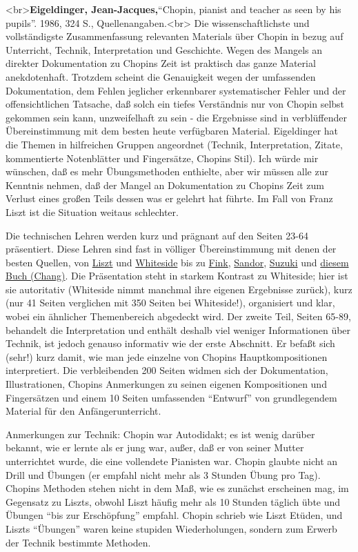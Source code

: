 \hypertarget{Eigeldinger}{}

<br>\textbf{Eigeldinger, Jean-Jacques,}\enquote{Chopin, pianist and teacher as seen by his pupils}. 1986, 324 S., Quellenangaben.<br>
Die wissenschaftlichste und vollständigste Zusammenfassung relevanten Materials über Chopin in bezug auf Unterricht, Technik, Interpretation und Geschichte.
Wegen des Mangels an direkter Dokumentation zu Chopins Zeit ist praktisch das ganze Material anekdotenhaft.
Trotzdem scheint die Genauigkeit wegen der umfassenden Dokumentation, dem Fehlen jeglicher erkennbarer systematischer Fehler und der offensichtlichen Tatsache, daß solch ein tiefes Verständnis nur von Chopin selbst gekommen sein kann, unzweifelhaft zu sein - die Ergebnisse sind in verblüffender Übereinstimmung mit dem besten heute verfügbaren Material.
Eigeldinger hat die Themen in hilfreichen Gruppen angeordnet (Technik, Interpretation, Zitate, kommentierte Notenblätter und Fingersätze, Chopins Stil).
Ich würde mir wünschen, daß es mehr Übungsmethoden enthielte, aber wir müssen alle zur Kenntnis nehmen, daß der Mangel an Dokumentation zu Chopins Zeit zum Verlust eines großen Teils dessen was er gelehrt hat führte.
Im Fall von Franz Liszt ist die Situation weitaus schlechter.

Die technischen Lehren werden kurz und prägnant auf den Seiten 23-64 präsentiert.
Diese Lehren sind fast in völliger Übereinstimmung mit denen der besten Quellen, von \hyperlink{Walker}{Liszt} und \hyperlink{Whiteside}{Whiteside} bis zu \hyperlink{Fink}{Fink}, \hyperlink{Sandor}{Sandor}, \hyperlink{Suzuki}{Suzuki} und \hyperlink{Chang}{diesem Buch (Chang)}.
Die Präsentation steht in starkem Kontrast zu Whiteside; hier ist sie autoritativ (Whiteside nimmt manchmal ihre eigenen Ergebnisse zurück), kurz (nur 41 Seiten verglichen mit 350 Seiten bei Whiteside!), organisiert und klar, wobei ein ähnlicher Themenbereich abgedeckt wird.
Der zweite Teil, Seiten 65-89, behandelt die Interpretation und enthält deshalb viel weniger Informationen über Technik, ist jedoch genauso informativ wie der erste Abschnitt.
Er befaßt sich (sehr!) kurz damit, wie man jede einzelne von Chopins Hauptkompositionen interpretiert.
Die verbleibenden 200 Seiten widmen sich der Dokumentation, Illustrationen, Chopins Anmerkungen zu seinen eigenen Kompositionen und Fingersätzen und einem 10 Seiten umfassenden \enquote{Entwurf} von grundlegendem Material für den Anfängerunterricht.

Anmerkungen zur Technik: Chopin war Autodidakt; es ist wenig darüber bekannt, wie er lernte als er jung war, außer, daß er von seiner Mutter unterrichtet wurde, die eine vollendete Pianisten war.
Chopin glaubte nicht an Drill und Übungen (er empfahl nicht mehr als 3 Stunden Übung pro Tag).
Chopins Methoden stehen nicht in dem Maß, wie es zunächst erscheinen mag, im Gegensatz zu Liszts, obwohl Liszt häufig mehr als 10 Stunden täglich übte und Übungen \enquote{bis zur Erschöpfung} empfahl.
Chopin schrieb wie Liszt Etüden, und Liszts \enquote{Übungen} waren keine stupiden Wiederholungen, sondern zum Erwerb der Technik bestimmte Methoden.

